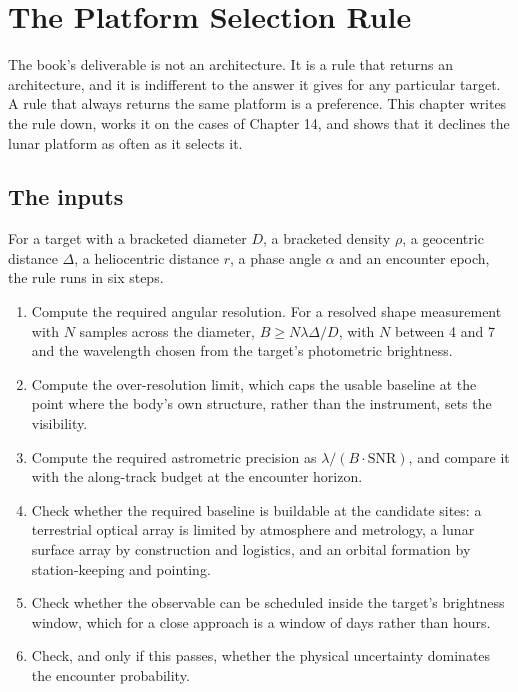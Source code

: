 
\chapter{The Platform Selection Rule}
\label{ch:selection-rule}

The book's deliverable is not an architecture. It is a rule that returns an
architecture, and it is indifferent to the answer it gives for any particular
target. A rule that always returns the same platform is a preference. This
chapter writes the rule down, works it on the cases of Chapter 14, and shows
that it declines the lunar platform as often as it selects it.

\section{The inputs}

For a target with a bracketed diameter \(D\), a bracketed density \(\rho\), a
geocentric distance \(\Delta\), a heliocentric distance \(r\), a phase angle
\(\alpha\) and an encounter epoch, the rule runs in six steps.

\begin{enumerate}
\item Compute the required angular resolution. For a resolved shape
measurement with \(N\) samples across the diameter,
\(B \geq N\lambda\Delta/D\), with \(N\) between 4 and 7 and the wavelength
chosen from the target's photometric brightness.
\item Compute the over-resolution limit, which caps the usable baseline at
the point where the body's own structure, rather than the instrument, sets
the visibility.
\item Compute the required astrometric precision as \(\lambda/(B\cdot
\mathrm{SNR})\), and compare it with the along-track budget at the
encounter horizon.
\item Check whether the required baseline is buildable at the candidate
sites: a terrestrial optical array is limited by atmosphere and metrology, a
lunar surface array by construction and logistics, and an orbital formation
by station-keeping and pointing.
\item Check whether the observable can be scheduled inside the target's
brightness window, which for a close approach is a window of days rather
than hours.
\item Check, and only if this passes, whether the physical uncertainty
dominates the encounter probability.
\end{enumerate}

